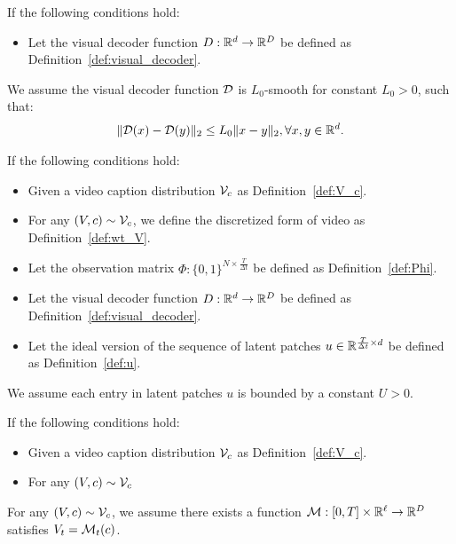 \begin{assumption}\label{ass:L_0}
    If the following conditions hold:
    \begin{itemize}
        \item Let the visual decoder function $D: \mathbb{R}^d \rightarrow \mathbb{R}^D$ be defined as Definition~\ref{def:visual_decoder}.
    \end{itemize}
    We assume the visual decoder function ${\cal D}$ is $L_0$-smooth for constant $L_0 > 0$, such that:
    \begin{align*}
        \| {\cal D}(x) - {\cal D}(y) \|_2 \leq L_0 \| x - y \|_2, \forall x, y \in \mathbb{R}^d.
    \end{align*}
\end{assumption}

\begin{assumption}\label{ass:U}
    If the following conditions hold:
    \begin{itemize}
        \item Given a video caption distribution ${\cal V}_c$ as Definition~\ref{def:V_c}.
        \item For any $(V, c) \sim {\cal V}_c$, we define the discretized form of video as Definition~\ref{def:wt_V}.
        \item Let the observation matrix $\Phi: \{0, 1\}^{N \times \frac{T}{\Delta t}}$ be defined as Definition~\ref{def:Phi}.
        \item Let the visual decoder function $D: \mathbb{R}^d \rightarrow \mathbb{R}^D$ be defined as Definition~\ref{def:visual_decoder}.
        \item Let the ideal version of the sequence of latent patches $u \in \mathbb{R}^{\frac{T}{\Delta t} \times d}$ be defined as Definition~\ref{def:u}.
    \end{itemize}
    We assume each entry in latent patches $u$ is bounded by a constant $U > 0$.
\end{assumption}

\begin{assumption}\label{ass:M}
    If the following conditions hold:
    \begin{itemize}
        \item Given a video caption distribution ${\cal V}_c$ as Definition~\ref{def:V_c}.
        \item For any $(V, c) \sim {\cal V}_c$
    \end{itemize}
    For any $(V, c) \sim {\cal V}_c$, we assume there exists a function ${\cal M}: [0, T] \times \mathbb{R}^\ell \rightarrow \mathbb{R}^D$ satisfies $V_t = {\cal M}_t(c)$. 
\end{assumption}

